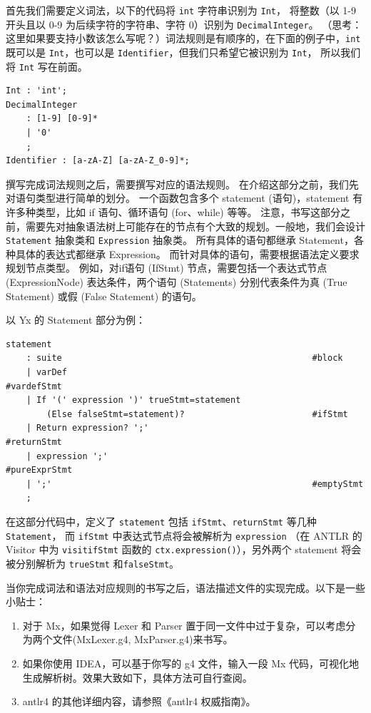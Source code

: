 首先我们需要定义词法，以下的代码将 \texttt{int} 字符串识别为 \texttt{Int}，
将整数（以 1-9 开头且以 0-9 为后续字符的字符串、字符 0）识别为 \texttt{DecimalInteger}。
（思考：这里如果要支持小数该怎么写呢？）词法规则是有顺序的，在下面的例子中，\texttt{int}
既可以是 \texttt{Int}，也可以是 \texttt{Identifier}，但我们只希望它被识别为 \texttt{Int}，
所以我们将 \texttt{Int} 写在前面。
\begin{lstlisting}
Int : 'int';
DecimalInteger
    : [1-9] [0-9]*
    | '0'
    ;
Identifier : [a-zA-Z] [a-zA-Z_0-9]*;
\end{lstlisting}



撰写完成词法规则之后，需要撰写对应的语法规则。
在介绍这部分之前，我们先对语句类型进行简单的划分。
一个函数包含多个 statement (语句)，statement 有许多种类型，比如 if 语句、循环语句 (for、while) 等等。
注意，书写这部分之前，需要先对抽象语法树上可能存在的节点有个大致的规划。一般地，我们会设计 \texttt{Statement}
抽象类和 \texttt{Expression} 抽象类。
所有具体的语句都继承 Statement，各种具体的表达式都继承 Expression。
而针对具体的语句，需要根据语法定义要求规划节点类型。
例如，对if语句 (IfStmt) 节点，需要包括一个表达式节点 (ExpressionNode) 表达条件，两个语句
(Statements) 分别代表条件为真 (True Statement) 或假 (False Statement) 的语句。

以 Yx 的 Statement 部分为例：
\begin{lstlisting}
statement
    : suite                                                 #block
    | varDef                                                #vardefStmt
    | If '(' expression ')' trueStmt=statement 
        (Else falseStmt=statement)?                         #ifStmt
    | Return expression? ';'                                #returnStmt
    | expression ';'                                        #pureExprStmt
    | ';'                                                   #emptyStmt
    ;
\end{lstlisting}
在这部分代码中，定义了 \texttt{statement}
包括 \texttt{ifStmt}、\texttt{returnStmt} 等几种\texttt{Statement}，
而 \texttt{ifStmt} 中表达式节点将会被解析为 \texttt{expression}
（在 ANTLR 的 Visitor 中为 \texttt{visitifStmt} 函数的 \texttt{ctx.expression()}），另外两个
statement 将会被分别解析为 \texttt{trueStmt} 和\texttt{falseStmt}。


当你完成词法和语法对应规则的书写之后，语法描述文件的实现完成。以下是一些小贴士：
\begin{enumerate}
    \item 对于 Mx，如果觉得 Lexer 和 Parser 置于同一文件中过于复杂，可以考虑分为两个文件(MxLexer.g4, MxParser.g4)来书写。
    \item 如果你使用 IDEA，可以基于你写的 g4 文件，输入一段 Mx 代码，可视化地生成解析树。效果大致如下，具体方法可自行查阅。
    \item antlr4 的其他详细内容，请参照《antlr4 权威指南》。
\end{enumerate}

